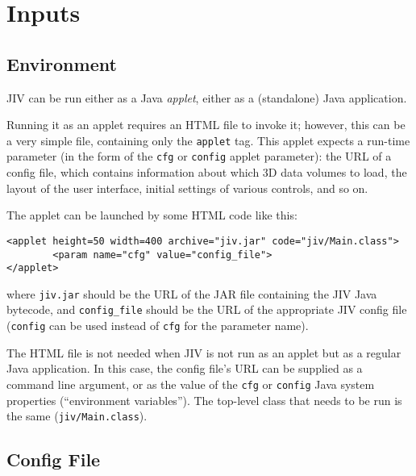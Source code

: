 %
%
%

\section{Inputs}
\label{sec:inputs}


\subsection{Environment}
\label{sec:environment}

JIV can be run either as a Java {\em applet}, either as a (standalone)
Java application. 

Running it as an applet requires an HTML file to invoke it; however,
this can be a very simple file, containing only the \verb+applet+ tag.
This applet expects a run-time parameter (in the form of the
\verb+cfg+ or \verb+config+ applet parameter): the URL of a config
file, which contains information about which 3D data volumes to load,
the layout of the user interface, initial settings of various
controls, and so on.

The applet can be launched by some HTML code like this:
\begin{verbatim}
<applet height=50 width=400 archive="jiv.jar" code="jiv/Main.class">
        <param name="cfg" value="config_file">
</applet>
\end{verbatim}
where \verb+jiv.jar+ should be the URL of the JAR file containing the
JIV Java bytecode, and \verb+config_file+ should be the URL of the
appropriate JIV config file (\verb+config+ can be used instead of
\verb+cfg+ for the parameter name).

The HTML file is not needed when JIV is not run as an applet but as a
regular Java application. In this case, the config file's URL can be
supplied as a command line argument, or as the value of the \verb+cfg+
or \verb+config+ Java system properties (``environment variables'').
The top-level class that needs to be run is the same
(\verb+jiv/Main.class+).


\subsection{Config File}
\label{sec:config-file}

